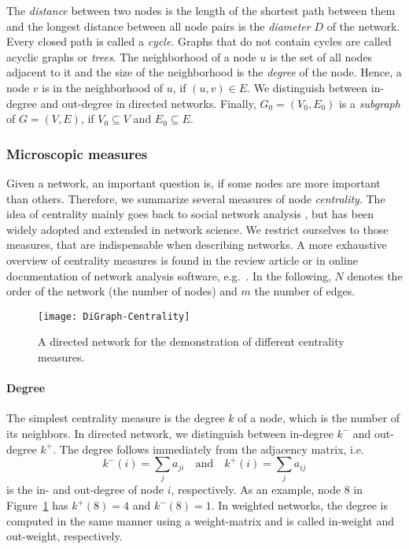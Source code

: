 The \emph{distance} between two nodes is the length of the shortest path between them and the longest distance between all node pairs is the \emph{diameter} $D$ of the network.
Every closed path is called a \emph{cycle}.
Graphs that do not contain cycles are called acyclic graphs or \emph{trees}.
The neighborhood of a node $u$ is the set of all nodes adjacent to it and the size of the neighborhood is the \emph{degree} of the node.
Hence, a node $v$ is in the neighborhood of $u$, if $(u,v) \in E$.
We distinguish between in-degree and out-degree in directed networks.
Finally, $G_0=(V_0,E_0)$ is a \emph{subgraph} of $G=(V,E)$, if $V_0 \subseteq V$ and $E_0 \subseteq E$.

\subsubsection{Microscopic measures}\label{sec:micro_measures}
Given a network, an important question is, if some nodes are more important than others.
Therefore, we summarize several measures of node \emph{centrality}.
The idea of centrality mainly goes back to social network analysis \citep{Granovetter:1973wj,Freeman,WassermanFaust}, but has been widely adopted and extended in network science.
We restrict ourselves to those measures, that are indispensable when describing networks.
A more exhaustive overview of centrality measures is found in the review article \citep{MartinezLopez2009} or in online documentation of network analysis software, e.g.~\citep{hagberg2008,networkx:}.
In the following, $N$ denotes the order of the network (the number of nodes) and $m$ the number of edges.
%
\begin{figure}[htb]
\begin{center}
\texttt{[image: DiGraph-Centrality]}
\caption{A directed network for the demonstration of different centrality measures.}
\label{fig:example_net}
\end{center}
\end{figure}
%

\paragraph{Degree\color{Cayenne}{.}}
The simplest centrality measure is the degree $k$ of a node, which is the number of its neighbors.
In directed network, we distinguish between in-degree $k^-$ and out-degree $k^+$.
The degree follows immediately from the adjacency matrix, i.e.
\[
k ^-(i) = \sum _j a_{ji} \quad \text{and} \quad k ^+ (i)= \sum _j a_{ij}
\]
is the in- and out-degree of node $i$, respectively.
As an example, node $8$ in Figure~\ref{fig:example_net} has $k ^+(8)=4$ and $k ^- (8)=1$.
In weighted networks, the degree is computed in the same manner using a weight-matrix and is called in-weight and out-weight, respectively.

